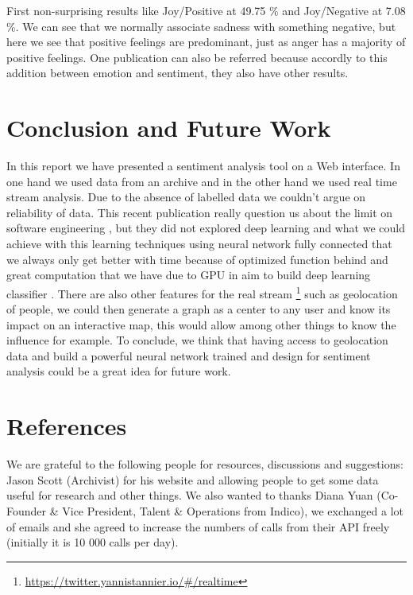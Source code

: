 \documentclass{acmtog} %
\begin{document}
First non-surprising results like Joy/Positive at 49.75 \% and Joy/Negative at 7.08 \%.
We can see that we normally associate sadness with something negative, but here we see that positive feelings are predominant, just as anger has a majority of positive feelings. One publication can also be referred \cite{Alm05} because accordly to this addition between emotion and sentiment, they also have other results.

\section{Conclusion and Future Work}
\label{sec:conclusion}

In this report we have presented a sentiment analysis tool on a Web interface. In one hand we used data from an archive and in the other hand we used real time stream analysis. Due to the absence of labelled data we couldn't argue on reliability of data.  This recent publication really question us about the limit on software engineering \cite{Lin18}, but they did not explored deep learning \cite{Meisheri17} and what we could achieve with this learning techniques using neural network fully connected that we always only get better with time because of optimized function behind and great computation that we have due to GPU in aim to build deep learning classifier \cite{Araque17}. 
There are also other features for the real stream \footnote{\url{https://twitter.yannistannier.io/#/realtime}} such as geolocation of people, we could then generate a graph as a center to any user and know its impact on an interactive map, this would allow among other things to know the influence for example. To conclude, we think that having access to geolocation data and build a powerful neural network trained and design for sentiment analysis could be a great idea for future work. 

\section{References}

\begin{acks}
We are grateful to the following people for resources, discussions and suggestions: Jason Scott (Archivist) for his website and allowing people to get some data useful for research and other things. We also wanted to thanks Diana Yuan (Co-Founder & Vice President, Talent & Operations from Indico), we exchanged a lot of emails and she agreed to increase the numbers of calls from their API freely (initially it is 10 000 calls per day).
\end{acks}




\end{document}
